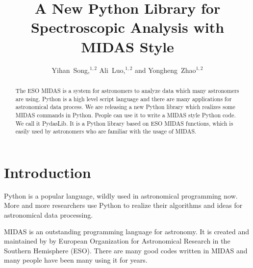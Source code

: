 
\resetcounters


\title{A New Python Library for Spectroscopic Analysis with MIDAS Style}
\author{Yihan~Song,$^{1,2}$ Ali~Luo,$^{1,2}$ and Yongheng~Zhao$^{1,2}$
}


\begin{abstract}
The ESO MIDAS is a system for astronomers to analyze data which many astronomers are using. Python is a high level script language and there are many applications for astronomical data process. We are releasing a new Python library which realizes some MIDAS commands in Python. People can use it to write a MIDAS style Python code. We call it PydasLib. It is a Python library based on ESO MIDAS functions, which is easily used by astronomers who are familiar with the usage of MIDAS.
\end{abstract}

	  \section{Introduction}
Python is a popular language, wildly used in astronomical programming now. More and more researchers use Python to realize their algorithms and ideas for astronomical data processing. 

MIDAS is an outstanding programming language for astronomy. It is created and maintained by by European Organization for Astronomical Research in the Southern Hemisphere (ESO). There are many good codes written in MIDAS and many people have been many using it for years.

